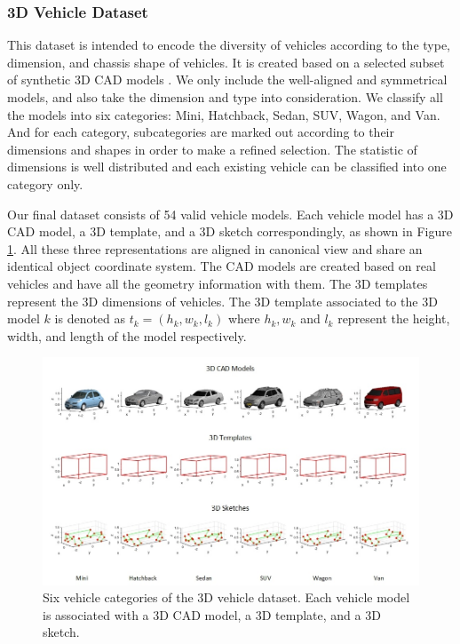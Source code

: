 \documentclass[a4paper,12pt]{article}
\begin{document}
\subsubsection{3D Vehicle Dataset}
\label{cad_models}
This dataset is intended to encode the diversity of vehicles according to the  type, dimension, and chassis shape of vehicles. It is created based on a selected subset of synthetic 3D CAD models \cite{NIPS2012_4562}. We only include the well-aligned and  symmetrical models, and also take the dimension and type into consideration. We classify all the models into six categories: Mini, Hatchback, Sedan, SUV, Wagon, and Van. And for each category,  subcategories are marked out according to their dimensions and shapes in order to make a refined selection.  The statistic of dimensions is well distributed and each existing vehicle can be classified into one category only.


Our final dataset consists of 54 valid vehicle models. Each vehicle model has a 3D CAD model, a 3D template, and a 3D sketch correspondingly, as shown in Figure \ref{figure:vehicle_dataset}. All these three representations are aligned in canonical view and share an identical object coordinate system. The CAD models are created based on real vehicles and have all the geometry information with them. The 3D templates represent the 3D dimensions of vehicles. The 3D template associated to the 3D model $k$ is denoted as $t_k = (h_k, w_k, l_k)$ where $h_k, w_k$ and $l_k$ represent the height, width, and length of the model respectively. 

\begin{figure}[H]		
	\includegraphics[width=1\textwidth]{vehicle_dataset.jpg}
	\caption[3D vehicle dataset]{Six vehicle categories of the 3D vehicle dataset. Each vehicle model is associated with a 3D CAD model, a 3D template, and a 3D sketch.}
	\centering
	\label{figure:vehicle_dataset}
\end{figure}
\end{document}
